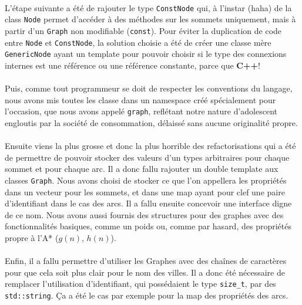 \documentclass[french]{article}
\begin{document}
\paragraph{} L'étape suivante a été de rajouter le type \texttt{ConstNode} qui,
à l'instar (haha) de la class \texttt{Node} permet d'accéder à des méthodes sur
les sommets uniquement, mais à partir d'un \texttt{Graph} non modifiable
(\texttt{const}). Pour éviter la duplication de code entre
\texttt{Node} et \texttt{ConstNode}, la solution choisie a été de créer une
classe mère \texttt{GenericNode} ayant un template pour pouvoir choisir si le
type des connexions internes est une référence ou une référence constante,
parce que \textbf{C++}!

\paragraph{} Puis, comme tout programmeur se doit de respecter les conventions
du langage, nous avons mis toutes les classe dans un namespace créé
spécialement pour l'occasion, que nous avons appelé \texttt{graph}, reflétant
notre nature d'adolescent engloutis par la société de consommation, délaissé
sans aucune originalité propre.

\paragraph{} Ensuite viens la plus grosse et donc la plus horrible des
refactorisations qui a été de permettre de pouvoir stocker des valeurs d'un
types arbitraires pour chaque sommet et pour chaque arc. Il a donc fallu
rajouter un double template aux classes \texttt{Graph}. Nous avons choisi de
stocker ce que l'on appellera les propriétés dans un vecteur pour les sommets,
et dans une map ayant pour clef une paire d'identifiant dans le cas des arcs.
Il a fallu ensuite concevoir une interface digne de ce nom. Nous avons aussi
fournis des structures pour des graphes avec des fonctionnalités basiques,
comme un poids ou, comme par hasard, des propriétés propre à l'A* ($g(n)$,
$h(n)$).

\paragraph{} Enfin, il a fallu permettre d'utiliser les Graphes avec des
chaînes de caractères pour que cela soit plus clair pour le nom des villes. Il
a donc été nécessaire de remplacer l'utilisation d'identifiant, qui possédaient
le type \texttt{size_t}, par des \texttt{std::string}. Ça a
été le cas par exemple pour la map des propriétés des arcs.
\end{document}
